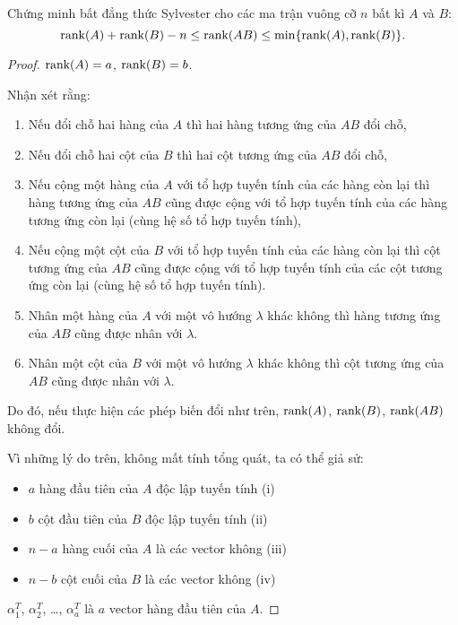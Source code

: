 \documentclass[class=nhvh-linear-algebra,crop=false]{standalone}
\begin{document}
\begin{exercise}
	\par Chứng minh bất đẳng thức Sylvester cho các ma trận vuông cỡ $n$ bất kì $A$ và $B$:
	\[
		\text{rank}(A) + \text{rank}(B) - n \le \text{rank}(AB) \le \min\{ \text{rank}(A), \text{rank}(B) \}.
	\]
\end{exercise}

\begin{proof}
	\par $\text{rank}(A) = a$, $\text{rank}(B) = b$.
	\par Nhận xét rằng:
	\begin{enumerate}[label = (\roman*)]
		\item Nếu đổi chỗ hai hàng của $A$ thì hai hàng tương ứng của $AB$ đổi chỗ,
		\item Nếu đổi chỗ hai cột của $B$ thì hai cột tương ứng của $AB$ đổi chỗ,
		\item Nếu cộng một hàng của $A$ với tổ hợp tuyến tính của các hàng còn lại thì hàng tương ứng của $AB$ cũng được cộng với tổ hợp tuyến tính của các hàng tương ứng còn lại (cùng hệ số tổ hợp tuyến tính),
		\item Nếu cộng một cột của $B$ với tổ hợp tuyến tính của các hàng còn lại thì cột tương ứng của $AB$ cũng được cộng với tổ hợp tuyến tính của các cột tương ứng còn lại (cùng hệ số tổ hợp tuyến tính).
		\item Nhân một hàng của $A$ với một vô hướng $\lambda$ khác không thì hàng tương ứng của $AB$ cũng được nhân với $\lambda$.
		\item Nhân một cột của $B$ với một vô hướng $\lambda$ khác không thì cột tương ứng của $AB$ cũng được nhân với $\lambda$.
	\end{enumerate}
	\par Do đó, nếu thực hiện các phép biến đổi như trên, $\text{rank}(A)$, $\text{rank}(B)$, $\text{rank}(AB)$ không đổi.
	\bigskip
	\par Vì những lý do trên, không mất tính tổng quát, ta có thể giả sử:
	\begin{itemize}
		\item $a$ hàng đầu tiên của $A$ độc lập tuyến tính (i)
		\item $b$ cột đầu tiên của $B$ độc lập tuyến tính (ii)
		\item $n - a$ hàng cuối của $A$ là các vector không (iii)
		\item $n - b$ cột cuối của $B$ là các vector không (iv)
	\end{itemize}
	\par $\alpha_{1}^{T}$, $\alpha_{2}^{T}$, \ldots, $\alpha_{a}^{T}$ là $a$ vector hàng đầu tiên của $A$.

\end{proof}
\end{document}

